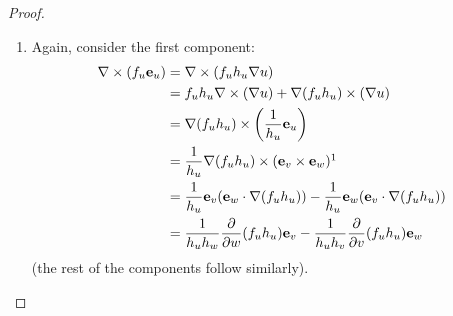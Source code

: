 \documentclass[10pt, a4paper]{article}
\begin{document}
\begin{proposition}
\begin{proof}
\begin{enumerate}[label = (\arabic*)]
            \item
            Again,
            consider the first component:
            \begin{align*}
                \bnabla \times (f_u\vec{e}_u) &= \bnabla \times (f_uh_u \bnabla u) \\
                &= f_uh_u\bnabla \times (\bnabla u) + \bnabla(f_uh_u) \times (\bnabla u) \\
                &= \bnabla(f_uh_u) \times \left(\frac{1}{h_u}\vec{e}_u\right) \\
                &= \frac{1}{h_u}\bnabla(f_uh_u) \times (\vec{e}_v \times \vec{e}_w)\footnotemark \\
                &= \frac{1}{h_u}\vec{e}_v(\vec{e}_w\cdot\bnabla(f_uh_u)) - \frac{1}{h_u}\vec{e}_w(\vec{e}_v\cdot\bnabla(f_uh_u)) \\
                &= \frac{1}{h_uh_w}\pd{w}(f_uh_u)\vec{e}_v - \frac{1}{h_uh_v}\pd{v}(f_uh_u)\vec{e}_w
            \end{align*}
            (the rest of the components follow similarly).
        \end{enumerate}
    \end{proof}
\end{proposition}
\end{document}
